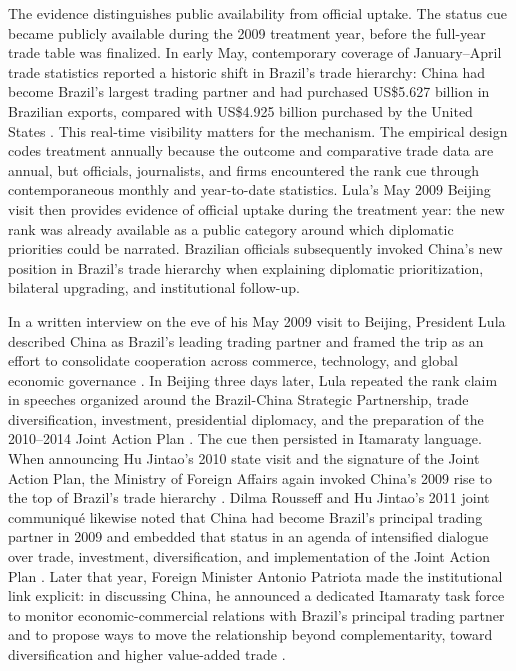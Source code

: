 \documentclass[referee,pdflatex,sn-basic]{sn-jnl}
\theoremstyle{thmstylethree}
\begin{document}
The evidence distinguishes public availability from official uptake. The status cue became publicly available during the 2009 treatment year, before the full-year trade table was finalized. In early May, contemporary coverage of January--April trade statistics reported a historic shift in Brazil's trade hierarchy: China had become Brazil's largest trading partner and had purchased US\$5.627 billion in Brazilian exports, compared with US\$4.925 billion purchased by the United States \citep{agencia_brasil2009_china_supera}. This real-time visibility matters for the mechanism. The empirical design codes treatment annually because the outcome and comparative trade data are annual, but officials, journalists, and firms encountered the rank cue through contemporaneous monthly and year-to-date statistics. Lula's May 2009 Beijing visit then provides evidence of official uptake during the treatment year: the new rank was already available as a public category around which diplomatic priorities could be narrated. Brazilian officials subsequently invoked China's new position in Brazil's trade hierarchy when explaining diplomatic prioritization, bilateral upgrading, and institutional follow-up.

In a written interview on the eve of his May 2009 visit to Beijing, President Lula described China as Brazil's leading trading partner and framed the trip as an effort to consolidate cooperation across commerce, technology, and global economic governance \citep[323]{mre_funag_resenha104_2009}. In Beijing three days later, Lula repeated the rank claim in speeches organized around the Brazil-China Strategic Partnership, trade diversification, investment, presidential diplomacy, and the preparation of the 2010--2014 Joint Action Plan \citep[115, 121--122]{mre_funag_resenha104_2009}. The cue then persisted in Itamaraty language. When announcing Hu Jintao's 2010 state visit and the signature of the Joint Action Plan, the Ministry of Foreign Affairs again invoked China's 2009 rise to the top of Brazil's trade hierarchy \citep[356]{mre_funag_resenha106_2010}. Dilma Rousseff and Hu Jintao's 2011 joint communiqué likewise noted that China had become Brazil's principal trading partner in 2009 and embedded that status in an agenda of intensified dialogue over trade, investment, diversification, and implementation of the Joint Action Plan \citep[160--161]{mre_funag_resenha108_2011}. Later that year, Foreign Minister Antonio Patriota made the institutional link explicit: in discussing China, he announced a dedicated Itamaraty task force to monitor economic-commercial relations with Brazil's principal trading partner and to propose ways to move the relationship beyond complementarity, toward diversification and higher value-added trade \citep[47]{mre_funag_resenha109_2011}.
\end{document}
